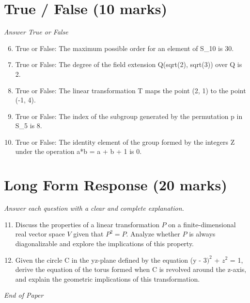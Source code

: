 \documentclass[12pt]{article}
\begin{document}
\section*{True / False (10 marks)}
\textit{Answer True or False}
\begin{enumerate}[label=\arabic*.]
\setcounter{enumi}{5}
\item True or False: The maximum possible order for an element of S\_10 is 30.
\item True or False: The degree of the field extension Q(sqrt(2), sqrt(3)) over Q is 2.
\item True or False: The linear transformation T maps the point (2, 1) to the point (-1, 4).
\item True or False: The index of the subgroup generated by the permutation p in S\_5 is 8.
\item True or False: The identity element of the group formed by the integers Z under the operation a*b = a + b + 1 is 0.
\end{enumerate}

\section*{Long Form Response (20 marks)}
\textit{Answer each question with a clear and complete explanation.}
\begin{enumerate}[label=\arabic*.]
\setcounter{enumi}{10}
\item Discuss the properties of a linear transformation \( P \) on a finite-dimensional real vector space \( V \) given that \( P^2 = P \). Analyze whether \( P \) is always diagonalizable and explore the implications of this property.
\item Given the circle C in the yz-plane defined by the equation (y - $3)^2$ + $z^2$ = 1, derive the equation of the torus formed when C is revolved around the z-axis, and explain the geometric implications of this transformation.
\end{enumerate}

\vfill
\noindent\textit{End of Paper}
\end{document}
